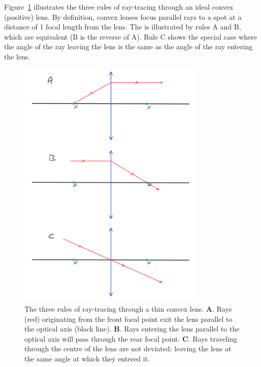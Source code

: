 \documentclass[a4paper]{report}
\begin{document}
     Figure~\ref{fig:raytracerules} illustrates the three rules of ray-tracing through an ideal convex (positive) lens. 
     By definition, convex lenses focus parallel rays to a spot at a distance of 1 focal length from the lens. 
     The is illustrated by rules A and B, which are equivalent (B is the reverse of A). 
     Rule C shows the special case where the angle of the ray leaving the lens is the same as the angle of the ray entering the lens. 
     

	\begin{figure}[h]
		\center
		\includegraphics[width=0.8\textwidth]{figures/ray_trace_rules.png}
		\captionsetup{width=0.95\textwidth}
		\caption{The three rules of ray-tracing through a thin convex lens.
		\textbf{A}. Rays (red) originating from the front focal point exit the lens parallel to the optical axis (black line).
		\textbf{B}. Rays entering the lens parallel to the optical axis will pass through the rear focal point.
		\textbf{C}. Rays traveling through the centre of the lens are not deviated: leaving the lens at the same angle at which they entered it. 
		}
		\label{fig:raytracerules}
	\end{figure}
	
	\clearpage 
	
\end{document}
